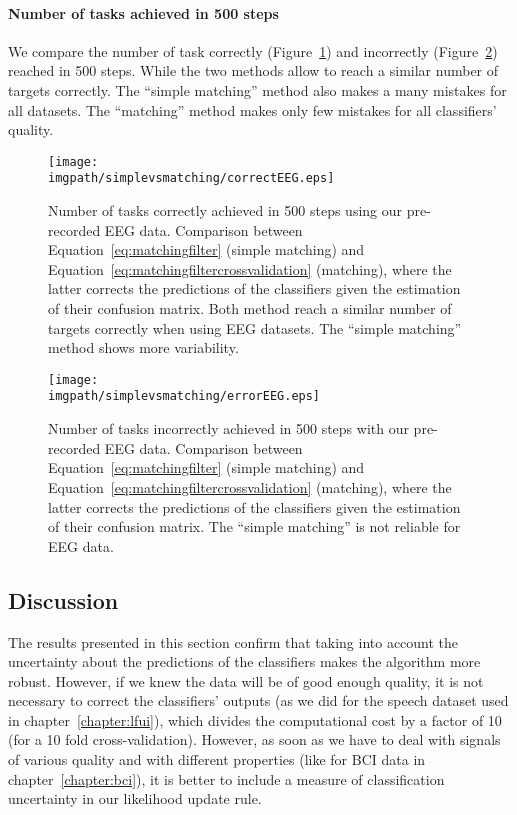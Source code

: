 \paragraph{Number of tasks achieved in 500 steps}

We compare the number of task correctly (Figure~\ref{fig:nCorrect_simplevsmatchingEEG}) and incorrectly (Figure~\ref{fig:nWrongEEG_simplevsmatchingEEG}) reached in 500 steps. While the two methods allow to reach a similar number of targets correctly. The ``simple matching'' method also makes a many mistakes for all datasets. The ``matching'' method makes only few mistakes for all classifiers' quality.

\begin{figure}[!htbp]
\centering
\texttt{[image: \\imgpath/simplevsmatching/correctEEG.eps]}
\caption{Number of tasks correctly achieved in 500 steps using our pre-recorded EEG data. Comparison between Equation~\ref{eq:matchingfilter} (simple matching) and Equation~\ref{eq:matchingfiltercrossvalidation} (matching), where the latter corrects the predictions of the classifiers given the estimation of their confusion matrix. Both method reach a similar number of targets correctly when using EEG datasets. The ``simple matching''  method shows more variability.}
\label{fig:nCorrect_simplevsmatchingEEG}
\end{figure} 

\begin{figure}[!htbp]
\centering
\texttt{[image: \\imgpath/simplevsmatching/errorEEG.eps]}
\caption{Number of tasks incorrectly achieved in 500 steps with our pre-recorded EEG data. Comparison between Equation~\ref{eq:matchingfilter} (simple matching) and Equation~\ref{eq:matchingfiltercrossvalidation} (matching), where the latter corrects the predictions of the classifiers given the estimation of their confusion matrix. The ``simple matching'' is not reliable for EEG data.}
\label{fig:nWrongEEG_simplevsmatchingEEG}
\end{figure} 

\subsection{Discussion}

The results presented in this section confirm that taking into account the uncertainty about the predictions of the classifiers makes the algorithm more robust. However, if we knew the data will be of good enough quality, it is not necessary to correct the classifiers' outputs (as we did for the speech dataset used in chapter~\ref{chapter:lfui}), which divides the computational cost by a factor of 10 (for a 10 fold cross-validation). However, as soon as we have to deal with signals of various quality and with different properties (like for BCI data in chapter~\ref{chapter:bci}), it is better to include a measure of classification uncertainty in our likelihood update rule.